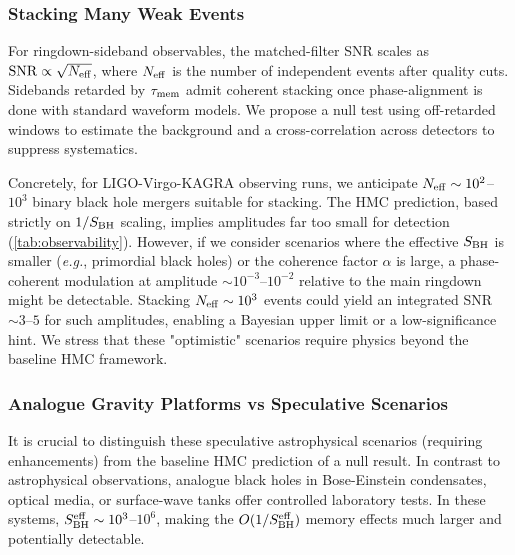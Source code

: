 \documentclass[11pt,a4paper]{article}
\newcommand{\eg}{\textit{e.g.}\xspace}
\newcommand{\HMC}{\textsc{HMC}\xspace}
\theoremstyle{plain}
\theoremstyle{definition}
\theoremstyle{remark}
\begin{document}
\subsubsection{Stacking Many Weak Events}
For ringdown-sideband observables, the matched-filter SNR scales as ${\rm SNR}\propto \sqrt{N_{\rm eff}}$, where $N_{\rm eff}$ is the number of independent events after quality cuts. Sidebands retarded by $\tau_{\rm mem}$ admit coherent stacking once phase-alignment is done with standard waveform models. We propose a null test using off-retarded windows to estimate the background and a cross-correlation across detectors to suppress systematics.

Concretely, for LIGO-Virgo-KAGRA observing runs, we anticipate $N_{\rm eff} \sim 10^2$--$10^3$ binary black hole mergers suitable for stacking. The \HMC{} prediction, based strictly on $1/S_{\rm BH}$ scaling, implies amplitudes far too small for detection (\cref{tab:observability}). However, if we consider scenarios where the effective $S_{\rm BH}$ is smaller (\eg, primordial black holes) or the coherence factor $\alpha$ is large, a phase-coherent modulation at amplitude $\sim 10^{-3}$--$10^{-2}$ relative to the main ringdown might be detectable. Stacking $N_{\rm eff} \sim 10^3$ events could yield an integrated SNR $\sim 3$--$5$ for such amplitudes, enabling a Bayesian upper limit or a low-significance hint.
We stress that these "optimistic" scenarios require physics beyond the baseline \HMC{} framework.

\subsubsection{Analogue Gravity Platforms vs Speculative Scenarios}
It is crucial to distinguish these speculative astrophysical scenarios (requiring enhancements) from the baseline \HMC{} prediction of a null result.
In contrast to astrophysical observations, analogue black holes in Bose-Einstein condensates, optical media, or surface-wave tanks offer controlled laboratory tests. In these systems, $S_{\rm BH}^{\rm eff} \sim 10^3$--$10^6$, making the $O(1/S_{\rm BH}^{\rm eff})$ memory effects much larger and potentially detectable.
\end{document}
